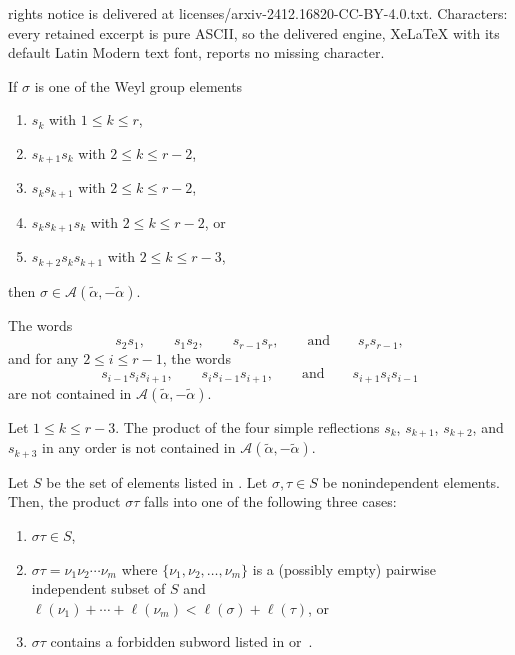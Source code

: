\documentclass[10pt,a4paper]{amsart}
\newcommand{\calA}{\mathcal{A}}
\newcommand{\hroot}{\tilde{\alpha}}
\begin{document}
rights notice is delivered at licenses/arxiv-2412.16820-CC-BY-4.0.txt. Characters: every retained excerpt is pure ASCII, so the delivered engine, XeLaTeX with its default Latin Modern text font, reports no missing character.
\begin{proposition}\label{prop:mu=-hroot}
If $\sigma$ is one of the Weyl group elements
\begin{enumerate}
\item[(a)] $s_k$ with $1 \le k \le r$,
\item[(b)] $s_{k+1}s_{k}$ with $2 \le k \le r-2$,
\item[(c)] $s_{k}s_{k+1}$ with $2 \le k \le r-2$, 
\item[(d)] $s_{k}s_{k+1}s_{k}$ with $2 \le k \le r-2$, or
\item[(e)] $s_{k+2}s_{k}s_{k+1}$ with $2 \le k \le r-3$, 
\end{enumerate}
then $\sigma \in \calA(\tilde{\alpha},-\tilde{\alpha})$. 
\end{proposition} 

\begin{lemma}\label{lem:forbidden words}
The words 
\[s_2s_1,\qquad s_1s_2,\qquad s_{r-1}s_r, \qquad \text{and} \qquad s_rs_{r-1},\] and for any $2 \le i \le r-1$, the words
\[s_{i-1}s_is_{i+1}, \qquad s_{i}s_{i-1}s_{i+1}, \qquad \text{and} \qquad s_{i+1}s_is_{i-1}\]
are not contained in $\calA(\hroot,-\hroot)$.
\end{lemma}

\begin{lemma} \label{Highest:1234}
Let $1 \leq k \leq r-3$. The product of the four simple reflections $s_k$, $s_{k+1}$, $s_{k+2}$, and $s_{k+3}$ in any order is not contained in $\mathcal{A}(\hroot,-\hroot)$.    
\end{lemma}

\begin{lemma}
    Let $S$ be the set of elements listed in .
    Let $\sigma, \tau\in S$ be nonindependent elements.
    Then, the product $\sigma\tau$ falls into one of the following three cases:
    \begin{enumerate}
        \item $\sigma\tau\in S$,
        \item $\sigma\tau=\nu_1\nu_2\cdots\nu_m$ where $\{\nu_1,\nu_2,\ldots,\nu_m\}$ is a (possibly empty) pairwise independent subset of $S$ and \\
        $\ell(\nu_1)+\cdots+\ell(\nu_m)<\ell(\sigma)+\ell(\tau)$, or
        \item $\sigma\tau$ contains a forbidden subword listed in  or~.
    \end{enumerate}
\end{lemma}
\end{document}
